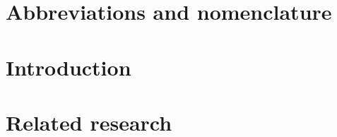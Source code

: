 \documentclass[12pt, oneside]{book}
\newcommand\blankpage{%
    \null
    \thispagestyle{empty}%
    \addtocounter{page}{-1}%
    \newpage}
\begin{document}
\begin{singlespace}
  \tableofcontents
\end{singlespace}

% 

% 

%   

% 

% 

\listoftables

\begin{singlespace}
  \listoffigures
\end{singlespace}

\chapter*{Abbreviations and nomenclature}


\chapter{Introduction}
\label{Chap:Intro}


\chapter{Related research}
\label{Chap:Related_research}

\end{document}
